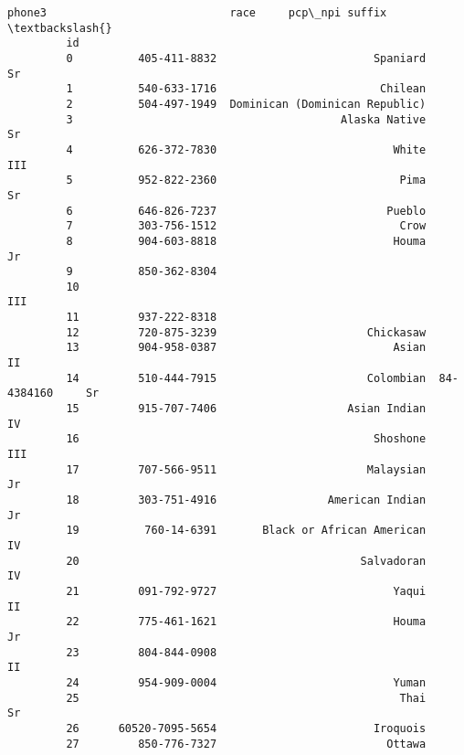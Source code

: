 \documentclass[11pt]{article}
\begin{document}
\begin{Verbatim}[commandchars=\\\{\}]
                          phone3                            race     pcp\_npi suffix  \textbackslash{}
         id                                                                           
         0          405-411-8832                        Spaniard                 Sr   
         1          540-633-1716                         Chilean                      
         2          504-497-1949  Dominican (Dominican Republic)                      
         3                                         Alaska Native                 Sr   
         4          626-372-7830                           White                III   
         5          952-822-2360                            Pima                 Sr   
         6          646-826-7237                          Pueblo                      
         7          303-756-1512                            Crow                      
         8          904-603-8818                           Houma                 Jr   
         9          850-362-8304                                                      
         10                                                                     III   
         11         937-222-8318                                                      
         12         720-875-3239                       Chickasaw                      
         13         904-958-0387                           Asian                 II   
         14         510-444-7915                       Colombian  84-4384160     Sr   
         15         915-707-7406                    Asian Indian                 IV   
         16                                             Shoshone                III   
         17         707-566-9511                       Malaysian                 Jr   
         18         303-751-4916                 American Indian                 Jr   
         19          760-14-6391       Black or African American                 IV   
         20                                           Salvadoran                 IV   
         21         091-792-9727                           Yaqui                 II   
         22         775-461-1621                           Houma                 Jr   
         23         804-844-0908                                                 II   
         24         954-909-0004                           Yuman                      
         25                                                 Thai                 Sr   
         26      60520-7095-5654                        Iroquois                      
         27         850-776-7327                          Ottawa                      

\end{Verbatim}
\end{document}
